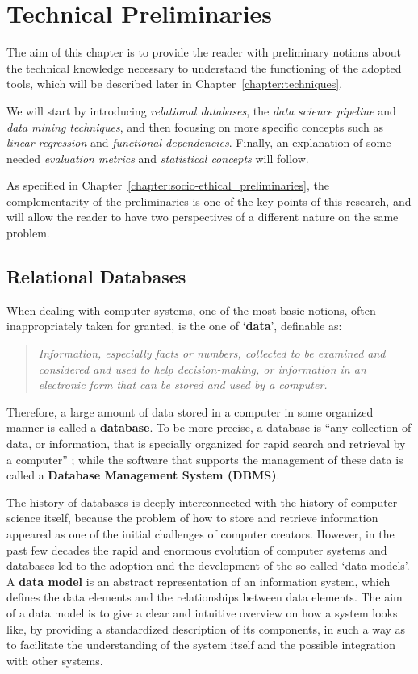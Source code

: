 \chapter{Technical Preliminaries}
\label{chapter:technical_preliminaries}
\thispagestyle{empty}

The aim of this chapter is to provide the reader with preliminary notions about the technical knowledge necessary to understand the functioning of the adopted tools, which will be described later in Chapter~\ref{chapter:techniques}.

We will start by introducing \textit{relational databases}, the \textit{data science pipeline} and \textit{data mining techniques}, and then focusing on more specific concepts such as \textit{linear regression} and \textit{functional dependencies}. Finally, an explanation of some needed \textit{evaluation metrics} and \textit{statistical concepts} will follow.

As specified in Chapter~\ref{chapter:socio-ethical_preliminaries}, the complementarity of the preliminaries is one of the key points of this research, and will allow the reader to have two perspectives of a different nature on the same problem.


\section{Relational Databases}
\label{section:relational_databases}
When dealing with computer systems, one of the most basic notions, often inappropriately taken for granted, is the one of `\textbf{data}', definable as:
\begin{quote}\emph{Information, especially facts or numbers, collected to be examined and considered and used to help decision-making, or information in an electronic form that can be stored and used by a computer.} \cite{cambridge2013data}\end{quote}
Therefore, a large amount of data stored in a computer in some organized manner is called a \textbf{database}. To be more precise, a database is ``any collection of data, or information, that is specially organized for rapid search and retrieval by a computer'' \cite{britannica2020database}; while the software that supports the management of these data is called a \textbf{Database Management System (DBMS)}.

The history of databases is deeply interconnected with the history of computer science itself, because the problem of how to store and retrieve information appeared as one of the initial challenges of computer creators. However, in the past few decades the rapid and enormous evolution of computer systems and databases led to the adoption and the development of the so-called `data models'. A \textbf{data model} \cite{abiteboul1995foundations} is an abstract representation of an information system, which defines the data elements and the relationships between data elements. The aim of a data model is to give a clear and intuitive overview on how a system looks like, by providing a standardized description of its components, in such a way as to facilitate the understanding of the system itself and the possible integration with other systems.

